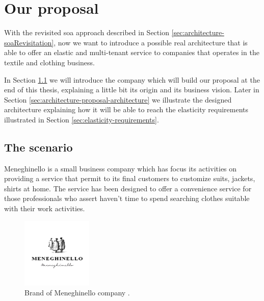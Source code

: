%
%
\section{Our proposal}
\label{sec:architecture-proposal}
With the revisited \ac{soa} approach described in Section \ref{sec:architecture-soaRevisitation}, now we
want to introduce a possible real architecture that is able to offer an elastic and multi-tenant service
to companies that operates in the textile and clothing business.

In Section \ref{sec:architecture-proposal-company} we will introduce the company which will build our
proposal at the end of this thesis, explaining a little bit its origin and its business vision. Later
in Section \ref{sec:architecture-proposal-architecture} we illustrate the designed architecture explaining
how it will be able to reach the elasticity requirements illustrated in Section \ref{sec:elasticity-requirements}.

\subsection{The scenario}
\label{sec:architecture-proposal-company}
Meneghinello \cite{meneghinelloHomePage} is a small business company which has focus its activities
on providing a service that permit to its final customers to customize suits, jackets, shirts at home.
The service has been designed to offer a convenience service for those professionals who assert haven't
time to spend searching clothes suitable with their work activities. 

\begin{figure}[h!]
	\centering{}
	\includegraphics[width=0.3\textwidth]{chapters/architecture/images/meneghinello.png}
	\caption[Meneghinello's brand]{Brand of Meneghinello company \cite{meneghinelloHomePage}.}
	\label{img:architecture-proposal-scenario}
\end{figure}

